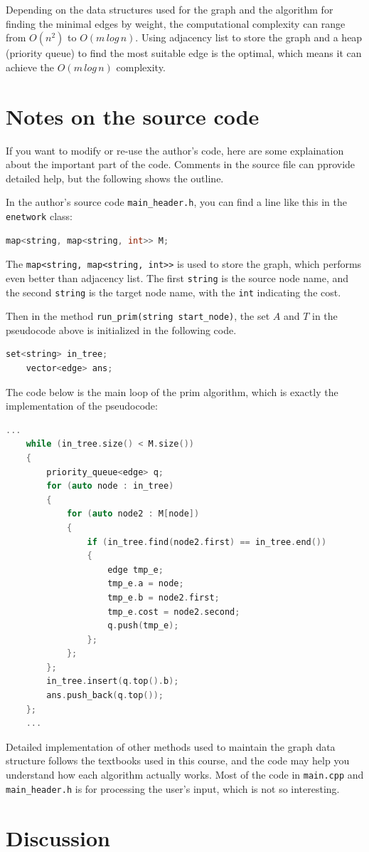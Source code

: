 \documentclass[cn,black,12pt,normal]{elegantnote}
\begin{document}
Depending on the data structures used for the graph and the algorithm for finding the minimal edges by weight, the computational complexity can range from $O(n^2)$ to $O(m\, log\, n)$. Using adjacency list to store the graph and a heap (priority queue) to find the most suitable edge is the optimal, which means it can achieve the $O(m\, log\, n)$ complexity.

\section{Notes on the source code}

If you want to modify or re-use the author's code, here are some explaination about the important part of the code. Comments in the source file can pprovide detailed help, but the following shows the outline.

In the author's source code \lstinline{main_header.h}, you can find a line like this in the \lstinline{enetwork} class:
\begin{lstlisting}[language = C++]
map<string, map<string, int>> M;
\end{lstlisting}
The \lstinline{map<string, map<string, int>>} is used to store the graph, which performs even better than adjacency list. The first \lstinline{string} is the source node name, and the second \lstinline{string} is the target node name, with the \lstinline{int} indicating the cost.

Then in the method \lstinline{run_prim(string start_node)}, the set $A$ and $T$ in the pseudocode above is initialized in the following code.
\begin{lstlisting}[language = C++]
    set<string> in_tree;
    vector<edge> ans;
\end{lstlisting}

The code below is the main loop of the prim algorithm, which is exactly the implementation of the pseudocode:
\begin{lstlisting}[language = C++]
    ...
    while (in_tree.size() < M.size())
    {
        priority_queue<edge> q;
        for (auto node : in_tree)
        {
            for (auto node2 : M[node])
            {
                if (in_tree.find(node2.first) == in_tree.end())
                {
                    edge tmp_e;
                    tmp_e.a = node;
                    tmp_e.b = node2.first;
                    tmp_e.cost = node2.second;
                    q.push(tmp_e);
                };
            };
        };
        in_tree.insert(q.top().b);
        ans.push_back(q.top());
    };
    ...
\end{lstlisting}

Detailed implementation of other methods used to maintain the graph data structure follows the textbooks used in this course, and the code may help you understand how each algorithm actually works. Most of the code in \lstinline{main.cpp} and \lstinline{main_header.h} is for processing the user's input, which is not so interesting.

\section{Discussion}


\end{document}
